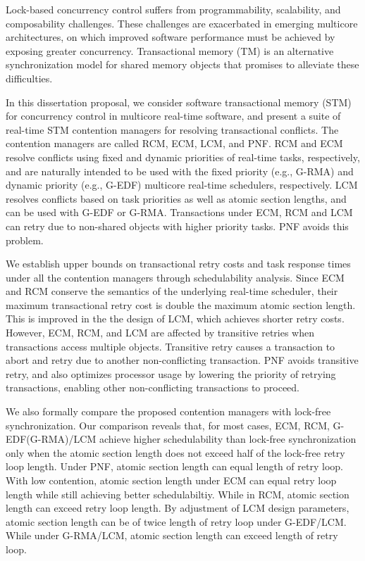 \documentclass[12pt,english]{report}
\begin{document}
\thispagestyle{empty}

Lock-based concurrency control suffers from programmability, scalability, and composability  challenges. These challenges are exacerbated in emerging multicore architectures, on which improved software performance must be achieved by exposing greater concurrency.   Transactional memory (TM) is an alternative synchronization model for shared memory objects that promises to alleviate these difficulties. 

In this dissertation proposal, we consider software transactional memory (STM) for concurrency control in multicore real-time software, and present a suite of real-time STM contention managers for resolving transactional conflicts. The contention managers are called RCM, ECM, LCM, and PNF. RCM and ECM resolve conflicts using fixed and dynamic priorities of real-time tasks, respectively, and are naturally intended to be used with the fixed priority (e.g., G-RMA) and dynamic priority (e.g., G-EDF) multicore real-time schedulers, respectively. LCM resolves conflicts based on task priorities as well as atomic section lengths, and can be used with G-EDF or G-RMA.
 Transactions under ECM, RCM and LCM can retry due to non-shared objects with higher priority tasks. PNF avoids this problem.

We establish upper bounds on transactional retry costs and task response times under all the contention managers through schedulability analysis. Since ECM and RCM conserve the semantics of the underlying real-time scheduler, their maximum transactional retry cost is double the maximum atomic section length. This is improved in the the design of LCM, which achieves  shorter retry costs.  However, ECM, RCM, and LCM are affected by transitive retries when transactions access multiple objects. 
Transitive retry causes a transaction to abort and retry due to another non-conflicting transaction.  
PNF avoids transitive retry, and also optimizes processor usage by lowering the priority of retrying transactions, enabling other non-conflicting transactions to proceed. 

We also formally compare the proposed contention managers with lock-free synchronization. 
Our comparison reveals that, for most cases, ECM, RCM, G-EDF(G-RMA)/LCM achieve higher schedulability than lock-free synchronization only when the atomic section length does not exceed half of the lock-free retry loop length. Under PNF, atomic section length can equal length of retry loop.
 With low contention, atomic section length under ECM can equal retry loop length while still achieving better schedulabiltiy. While in RCM, atomic section length can exceed retry loop length. By adjustment of LCM design parameters, atomic section length can be of twice length of retry loop under G-EDF/LCM. While under G-RMA/LCM, atomic section length can exceed length of retry loop.
\end{document}
